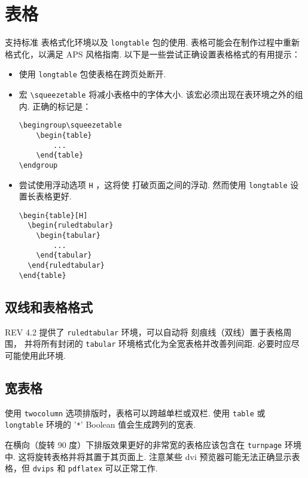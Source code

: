 \documentclass[twocolumn, amssymb, bibnotes, aps, prd, 10pt]{revtex4-2}
\newcommand{\revtex}{REV\hologo{TeX}}
\newcommand{\classoption}[1]{\texttt{#1}}
\newcommand{\macro}[1]{\texttt{\textbackslash#1}}
\newcommand{\m}[1]{\macro{#1}}
\newcommand{\env}[1]{\texttt{#1}}
\begin{document}
\section{表格}
\label{sec:tables}
支持标准 {} 表格式化环境以及 \texttt{longtable} 包的使用. 表格可能会在制作过程中重新格式化，以满足 APS 风格指南. 以下是一些尝试正确设置表格格式的有用提示：
\begin{itemize}
\item 使用 \texttt{longtable} 包使表格在跨页处断开.
\item 宏 \m{squeezetable} 将减小表格中的字体大小. 该宏必须出现在表环境之外的组内. 正确的标记是：
\begin{verbatim}
\begingroup\squeezetable
    \begin{table}
        ...
    \end{table}
\endgroup
\end{verbatim}
\item 尝试使用浮动选项 \texttt{H} ，这将使 {} 打破页面之间的浮动. 然而使用 \env{longtable} 设置长表格更好.
\begin{verbatim}
\begin{table}[H]
  \begin{ruledtabular}
    \begin{tabular}
        ...
    \end{tabular}
  \end{ruledtabular}
\end{table}
\end{verbatim}
\end{itemize}

\subsection{双线和表格格式}
{\revtex} 4.2 提供了 \env{ruledtabular} 环境，可以自动将 刻痕线（双线）置于表格周围，
并将所有封闭的 \env{tabular} 环境格式化为全宽表格并改善列间距. 必要时应尽可能使用此环境.

\subsection{宽表格}
使用 \classoption{twocolumn} 选项排版时，表格可以跨越单栏或双栏. 使用 \env{table} 或 \env{longtable} 环境的 '\verb+*+' Boolean 值会生成跨列的宽表.

在横向（旋转 90 度）下排版效果更好的非常宽的表格应该包含在 \env{turnpage} 环境中. 这将旋转表格并将其置于其页面上. 注意某些 dvi 预览器可能无法正确显示表格，但 \texttt{dvips} 和 \texttt{pdflatex} 可以正常工作.
\end{document}
